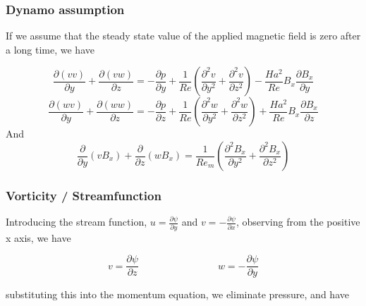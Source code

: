 \documentclass[11pt]{article}
\begin{document}
\subsubsection{Dynamo assumption}
If we assume that the steady state value of the applied magnetic field is zero after a long time, we have

\begin{equation}
	\frac{\partial (v v)}{\partial y}
	+ \frac{\partial (v w)}{\partial z}
	=
	- \frac{\partial p}{\partial y}
	+ \frac{1}{Re}
	\left(
	\frac{\partial^2 v}{\partial y^2}
	+\frac{\partial^2 v}{\partial z^2}
	\right)
	-
	\frac{Ha^2}{Re}
	B_x
	\frac{\partial B_x}{\partial y}
\end{equation}
\begin{equation}
	\frac{\partial (w v)}{\partial y}
	+ \frac{\partial (w w)}{\partial z}
	=
	- \frac{\partial p}{\partial z}
	+ \frac{1}{Re}
	\left(
	\frac{\partial^2 w}{\partial y^2}
	+\frac{\partial^2 w}{\partial z^2}
	\right)
	+ \frac{Ha^2}{Re}
	B_x
	\frac{\partial B_x}{\partial z}
\end{equation}
And
\begin{equation}
	\frac{\partial}{\partial y} (v B_x)
	+ \frac{\partial}{\partial z} (w B_x)
	=
	\frac{1}{Re_m}
	\left(
	\frac{\partial^2 B_x}{\partial y^2}
	+
	\frac{\partial^2 B_x}{\partial z^2}
	\right)
\end{equation}

\subsubsection{Vorticity / Streamfunction}

Introducing the stream function, $u = \frac{\partial \psi}{\partial y}$ and $v = - \frac{\partial \psi}{\partial x}$, observing from the positive x axis, we have

\begin{equation}
	v = \frac{\partial \psi}{\partial z}
	\qquad \qquad \qquad \qquad
	w = - \frac{\partial \psi}{\partial y}
\end{equation}

substituting this into the momentum equation, we eliminate pressure, and have
\end{document}
